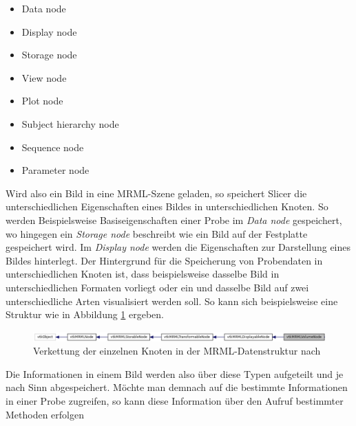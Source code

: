 \begin{minipage}{0.45\textwidth}
	\begin{itemize}
		\item Data node

		\item Display node

		\item Storage node

		\item View node
	\end{itemize}
\end{minipage}
\hfill
\begin{minipage}{0.45\textwidth}
	\begin{itemize}
		\item Plot node

		\item Subject hierarchy node

		\item Sequence node

		\item Parameter node
	\end{itemize}
\end{minipage}

Wird also ein Bild in eine \ac{MRML}-Szene geladen, so speichert Slicer die unterschiedlichen
Eigenschaften eines Bildes in unterschiedlichen Knoten. So werden Beispielsweise
Basiseigenschaften einer Probe im \textit{Data node} gespeichert, wo hingegen
ein \textit{Storage node} beschreibt wie ein Bild auf der Festplatte gespeichert
wird. Im \textit{Display node} werden die Eigenschaften zur Darstellung eines Bildes
hinterlegt. Der Hintergrund für die Speicherung von Probendaten in
unterschiedlichen Knoten ist, dass beispielsweise dasselbe Bild in unterschiedlichen
Formaten vorliegt oder ein und dasselbe Bild auf zwei unterschiedliche Arten visualisiert
werden soll. So kann sich beispielsweise eine Struktur wie in Abbildung
\ref{fig:3d_slicer_class} ergeben.

\begin{figure}[h]
	\centering
	\includegraphics[width=1\textwidth]{img/slicer_class_index.jpg}
	\caption{Verkettung der einzelnen Knoten in der MRML-Datenstruktur nach \citet{slicer2024}}
	\label{fig:3d_slicer_class}
\end{figure}

Die Informationen in einem Bild werden also über diese Typen aufgeteilt und je nach
Sinn abgespeichert. Möchte man demnach auf die bestimmte Informationen in einer
Probe zugreifen, so kann diese Information über den Aufruf bestimmter Methoden erfolgen

